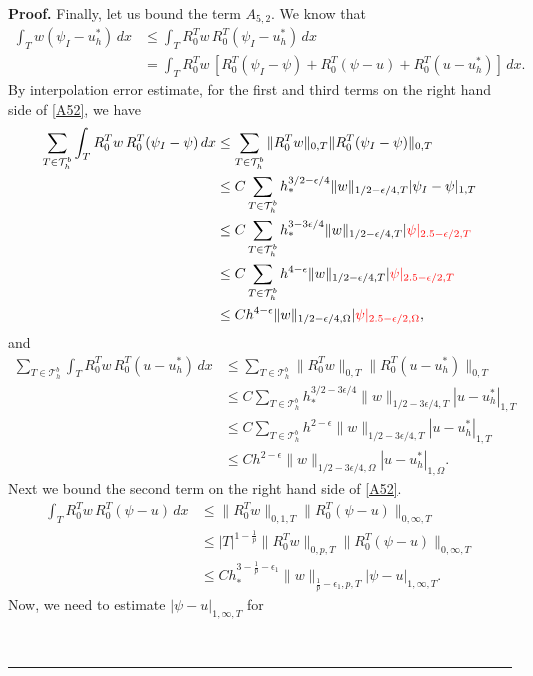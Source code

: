 \documentclass[12pt]{article}
\newenvironment{proof}[1][Proof]{\textbf{#1.} }
{\ \rule{0.75em}{0.75em}\smallskip}
\begin{document}
\begin{proof}
Finally, let us bound the term $A_{5,2}$. We know that
\begin{align}
\int_T w(\psi_I - u_h^*)\,dx &\leq \int_T R^T_0 w \, R^T_0(\psi_I - u_h^*)\,dx \nonumber\\
& =\int_T R^T_0 w \, [R^T_0(\psi_I -\psi) + R^T_0(\psi - u) + R^T_0(u - u_h^*)]\,dx.\label{A52}
\end{align}
By interpolation error estimate, for the first and third terms on the right hand side of \eqref{A52}, we have
\begin{align*}
\sum_{T\in \mathcal{T}_h^b} \int_T R^T_0 w \, R^T_0(\psi_I -\psi) \,dx  
&\leq \sum_{T\in \mathcal{T}_h^b} \|R^T_0 w\|_{0,T} \|R^T_0(\psi_I -\psi)\|_{0,T}\\
&\leq  C \sum_{T\in \mathcal{T}_h^b} h_*^{3/2-\epsilon/4}  \|w\|_{1/2-\epsilon/4, T}|\psi_I -\psi|_{1,T} \\
&\leq C \sum_{T\in \mathcal{T}_h^b} h_*^{3-3\epsilon/4}   \|w\|_{1/2-\epsilon/4, T}|{\color{red} \psi|_{2.5-\epsilon/2,T}}\\ 
&\leq  C \sum_{T\in \mathcal{T}_h^b} h^{4-\epsilon}   \|w\|_{1/2-\epsilon/4, T}|{\color{red} \psi|_{2.5-\epsilon/2,T}}\\
&\leq C h^{4-\epsilon}   \|w\|_{1/2-\epsilon/4, \Omega}|{\color{red} \psi|_{2.5-\epsilon/2,\Omega}}, 
\end{align*}
and
\begin{align*}
\sum_{T\in \mathcal{T}_h^b} \int_T R^T_0 w \, R^T_0(u - u_h^*) \,dx  
&\leq \sum_{T\in \mathcal{T}_h^b} \|R^T_0 w\|_{0,T} \|R^T_0(u - u_h^*)\|_{0,T}\\
&\leq  C \sum_{T\in \mathcal{T}_h^b} h_*^{3/2-3\epsilon/4}  \|w\|_{1/2-3\epsilon/4, T}|u - u_h^*|_{1,T} \\
&\leq C \sum_{T\in \mathcal{T}_h^b} h^{2-\epsilon}   \|w\|_{1/2-3\epsilon/4, T}|u - u_h^*|_{1,T}\\ 
&\leq  C  h^{2-\epsilon}   \|w\|_{1/2-3\epsilon/4, \Omega}|u - u_h^*|_{1,\Omega}.
\end{align*}
Next we bound the second term on the right hand side of \eqref{A52}.
\begin{align*}
\int_T R^T_0 w \, R^T_0(\psi - u) \,dx 
& \leq \|R^T_0 w\|_{0,1,T} \|R^T_0(\psi - u)\|_{0,\infty,T}\\
&\leq  |T|^{1-\frac{1}{p}} \|R^T_0 w\|_{0,p,T} \|R^T_0(\psi - u)\|_{0,\infty,T}\\
&\leq C h_*^{3-\frac{1}{p}-\epsilon_1}\|w\|_{\frac{1}{p}-\epsilon_1,p,T}|\psi-u|_{1,\infty,T}.
\end{align*}
Now, we need to estimate $|\psi-u|_{1,\infty,T}$ for

\end{proof}
\end{document}
